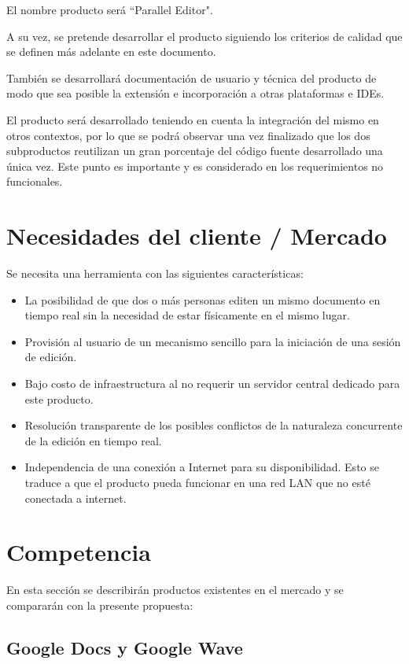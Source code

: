 \documentclass[12pt,a4paper]{article}
\begin{document}
El nombre producto será ``Parallel Editor".

A su vez, se pretende desarrollar el producto siguiendo los criterios de calidad que se definen más adelante en este documento.

También se desarrollará documentación de usuario y técnica del producto de modo que sea posible la extensión e incorporación a otras plataformas e IDEs.

El producto será desarrollado teniendo en cuenta la integración del mismo en otros contextos, por lo que se podrá observar una vez finalizado que los dos subproductos reutilizan un gran porcentaje del código fuente desarrollado una única vez. Este punto es importante y es considerado en los requerimientos no funcionales.	
	
	\section{Necesidades del cliente / Mercado}
	
	Se necesita una herramienta con las siguientes características:
	\begin{itemize}
		\item La posibilidad de que dos o más personas editen un mismo documento en tiempo real sin la necesidad de estar físicamente en el mismo lugar.
		\item Provisión al usuario de un mecanismo sencillo para la iniciación de una sesión de edición.
		\item Bajo costo de infraestructura al no requerir un servidor central dedicado para este producto.
		\item Resolución transparente de los posibles conflictos de la naturaleza concurrente de la edición en tiempo real.
		\item Independencia de una conexión a Internet para su disponibilidad. Esto se traduce a que el producto pueda funcionar en una red LAN que no esté conectada a internet.
	\end{itemize}

	\section{Competencia}

En esta sección se describirán productos existentes en el mercado y se compararán con la presente propuesta:

	\subsection{Google Docs \cite{googledocs} y Google Wave \cite{googlewave}}
\end{document}
